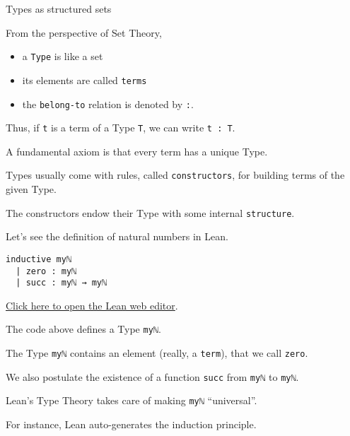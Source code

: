 \documentclass{beamer}
\begin{document}
\begin{frame}[fragile]{Types as structured sets}

From the perspective of Set Theory,

\vspace{-18pt}
\begin{itemize}
\setlength\itemsep{-18pt}
\item
  a {\color{violet}\verb`Type`} is like a set
\item
  its elements are called {\color{violet}\verb`terms`}
\item
  the {\color{violet}\verb`belong-to`} relation is denoted by {\color{violet}\verb`:`}.
\end{itemize}

Thus, if {\color{violet}\verb`t`} is a term of a Type {\color{violet}\verb`T`}, we can write {\color{violet}\verb`t : T`}.
\vspace{-10pt}

A fundamental axiom is that every term has a unique Type.
\vspace{-10pt}

Types usually come with rules, called {\color{violet}\verb`constructors`}, for building terms of the given Type.
\vspace{-10pt}

The constructors endow their Type with some internal {\color{violet}\verb`structure`}.
\vspace{-10pt}

Let's see the definition of natural numbers in Lean.
\end{frame}

\begin{frame}[fragile]

\begin{verbatim}
inductive myℕ
  | zero : myℕ
  | succ : myℕ → myℕ
\end{verbatim}
{\small{\href{https://leanprover-community.github.io/lean-web-editor/#code=inductive%20my%E2%84%95%0A%20%20%7C%20zero%20%3A%20my%E2%84%95%0A%20%20%7C%20succ%20%3A%20my%E2%84%95%20%E2%86%92%20my%E2%84%95%0A%0A%23print%20prefix%20my%E2%84%95%0A}{Click here to open the Lean web editor}.}}
\bigskip

The code above defines a Type {\color{violet}\verb`myℕ`}.
\bigskip

The Type {\color{violet}\verb`myℕ`} contains an element (really, a {\color{violet}\verb`term`}), that we call {\color{violet}\verb`zero`}.
\bigskip

We also postulate the existence of a function {\color{violet}\verb`succ`} from {\color{violet}\verb`myℕ`} to {\color{violet}\verb`myℕ`}.
\bigskip

Lean's Type Theory takes care of making {\color{violet}\verb`myℕ`} ``universal''.
\bigskip

For instance, Lean auto-generates the induction principle.
\end{frame}
\end{document}
